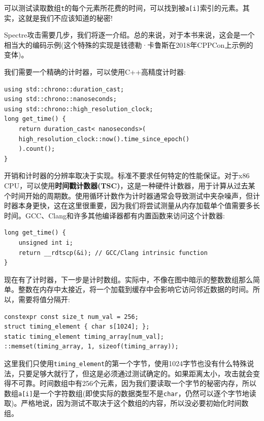 可以测试读取数组\texttt{t}的每个元素所花费的时间，可以找到被\texttt{a[i]}索引的元素。其实，这就是我们不应该知道的秘密!


Spectre攻击需要几步，我们将逐一介绍。总的来说，对于本书来说，这会是一个相当大的编码示例(这个特殊的实现是钱德勒·卡鲁斯在2018年CPPCon上示例的变体)。

我们需要一个精确的计时器，可以使用C++高精度计时器:

\begin{lstlisting}[style=styleCXX]
using std::chrono::duration_cast;
using std::chrono::nanoseconds;
using std::chrono::high_resolution_clock;
long get_time() {
	return duration_cast< nanoseconds>(
	high_resolution_clock::now().time_since_epoch()
	).count();
}
\end{lstlisting}

开销和计时器的分辨率取决于实现。标准不要求任何特定的性能保证。对于x86 CPU，可以使用\textbf{时间戳计数器(TSC)}，这是一种硬件计数器，用于计算从过去某个时间开始的周期数。使用循环计数作为计时器通常会导致测试中夹杂噪声，但计时器本身更快，这在这里很重要，因为我们将尝试测量从内存加载单个值需要多长时间。GCC、Clang和许多其他编译器都有内置函数来访问这个计数器:

\begin{lstlisting}[style=styleCXX]
long get_time() {
	unsigned int i;
	return __rdtscp(&i); // GCC/Clang intrinsic function
}
\end{lstlisting}

现在有了计时器，下一步是计时数组。实际中，不像在图中暗示的整数数组那么简单。整数在内存中太接近，将一个加载到缓存中会影响它访问邻近数据的时间。所以，需要将值分隔开:

\begin{lstlisting}[style=styleCXX]
constexpr const size_t num_val = 256;
struct timing_element { char s[1024]; };
static timing_element timing_array[num_val];
::memset(timing_array, 1, sizeof(timing_array));
\end{lstlisting}

这里我们只使用\texttt{timing\_element}的第一个字节，使用1024字节也没有什么特殊说法，只要足够大就行了，但这是必须通过测试确定的。如果距离太小，攻击就会变得不可靠。时间数组中有256个元素，因为我们要读取一个字节的秘密内存，所以数组\texttt{a[i]}是一个字符数组(即使实际的数据类型不是\texttt{char}，仍然可以逐个字节地读取)。严格地说，因为测试不取决于这个数组的内容，所以没必要初始化时间数组。

